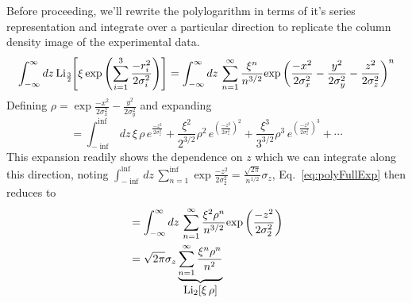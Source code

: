 Before proceeding, we'll rewrite the polylogarithm in terms of it's series representation and integrate over a particular direction to replicate the column density image of the experimental data.
\begin{equation}
	\int_{-\infty}^{\infty} dz\,\text{Li}_{\scriptscriptstyle\frac{3}{2}\!}\!\left[ \xi \,\text{exp}\left( {\sum_{i=1}^3 \frac{-r_i^2}{2\sigma_i^2}} \right) \right] = 
	\int_{-\infty}^{\infty} dz\, \sum_{n=1}^{\infty} \frac{\xi^n}{n^{3/2}}\text{exp}\left( {\frac{-x^2}{2\sigma_x^2} - \frac{y^2}{2\sigma_y^2} - \frac{z^2}{2\sigma_z^2}} \right)^n
\end{equation}
Defining $\rho=\exp{\frac{-x^2}{2\sigma_x^2} - \frac{y^2}{2\sigma_y^2}}$ and expanding
\begin{equation} \label{eq:polyFullExp}
	=\int_{-\inf}^{\inf} dz\, \xi\,\rho\,e^{\frac{-z^2}{2\sigma_z^2}} + 
 \frac{\xi^2}{2^{3/2}}\rho^2\,e^{\left(\frac{-z^2}{2\sigma_z^2}\right)^2} + 
 \frac{\xi^3}{3^{3/2}}\rho^3\,e^{\left(\frac{-z^2}{2\sigma_z^2}\right)^3} + \cdots
\end{equation}
This expansion readily shows the dependence on $z$ which we can integrate along this direction, noting $\displaystyle\int_{-\inf}^{\inf} dz\, \sum_{n=1}^{\inf}\exp{\frac{-z^2}{2\sigma_2^2}} = \frac{\sqrt{2\pi}}{n^{1/2}}\sigma_z$, Eq.\, \ref{eq:polyFullExp} then reduces to
\begin{equation}
\begin{split}
	&=\int_{-\infty}^{\infty} dz\, \sum_{n=1}^{\infty}\frac{\xi^2\rho^n}{n^{3/2}}\text{exp}\left( {\frac{-z^2}{2\sigma_2^2}} \right) \\
	&=\sqrt{2\pi}\sigma_z\underbrace{\sum_{n=1}^{\infty}\frac{\xi^n\rho^n}{n^2}}_{\displaystyle\text{Li}_{2}\!\left[ \xi\,\rho \right]}
\end{split}
\end{equation}

